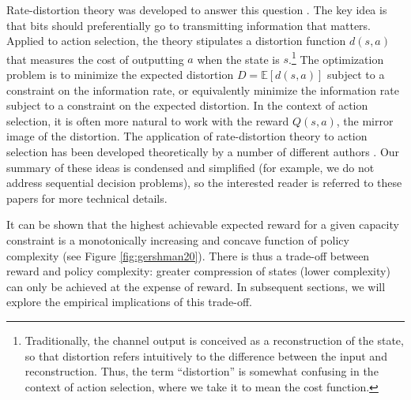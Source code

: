 \documentclass[11pt]{article}
\begin{document}
Rate-distortion theory was developed to answer this question \citep{berger71}.  The key idea is that bits should preferentially go to transmitting information that matters. Applied to action selection, the theory stipulates a distortion function $d(s,a)$ that measures the cost of outputting $a$ when the state is $s$.\footnote{Traditionally, the channel output is conceived as a reconstruction of the state, so that distortion refers intuitively to the difference between the input and reconstruction. Thus, the term ``distortion'' is somewhat confusing in the context of action selection, where we take it to mean the cost function.} The optimization problem is to minimize the expected distortion $D = \mathbb{E}[d(s,a)]$ subject to a constraint on the information rate, or equivalently minimize the information rate subject to a constraint on the expected distortion. In the context of action selection, it is often more natural to work with the reward $Q(s,a)$, the mirror image of the distortion. The application of rate-distortion theory to action selection has been developed theoretically by a number of different authors \citep{tishby11,parush11,lerch18,fox15,still12,grau18}. Our summary of these ideas is condensed and simplified (for example, we do not address sequential decision problems), so the interested reader is referred to these papers for more technical details.

It can be shown that the highest achievable expected reward for a given capacity constraint is a monotonically increasing and concave function of policy complexity (see Figure \ref{fig:gershman20}). There is thus a trade-off between reward and policy complexity: greater compression of states (lower complexity) can only be achieved at the expense of reward. In subsequent sections, we will explore the empirical implications of this trade-off.
\end{document}
